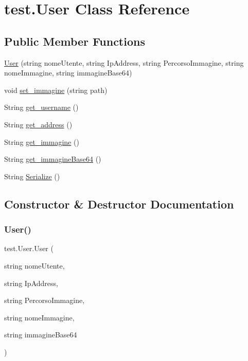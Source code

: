 \hypertarget{classtest_1_1_user}{}\section{test.\+User Class Reference}
\label{classtest_1_1_user}
\subsection*{Public Member Functions}
\begin{DoxyCompactItemize}
\item 
\hyperlink{classtest_1_1_user_aa5b8355fff5692bc8b9b2fcced71d331}{User} (string nome\+Utente, string Ip\+Address, string Percorso\+Immagine, string nome\+Immagine, string immagine\+Base64)
\item 
void \hyperlink{classtest_1_1_user_ac5a4d8f26aae0be17ab0fd22410ecb0a}{set\+\_\+immagine} (string path)
\item 
String \hyperlink{classtest_1_1_user_a1f56726e19de4b123009069dd2f2cba3}{get\+\_\+username} ()
\item 
String \hyperlink{classtest_1_1_user_aaa4b11d84013266789599abf6246e3a6}{get\+\_\+address} ()
\item 
String \hyperlink{classtest_1_1_user_a80ae020596b834407ce9e421595ea291}{get\+\_\+immagine} ()
\item 
String \hyperlink{classtest_1_1_user_a1b26cc2f3735e24053a384c728314926}{get\+\_\+immagine\+Base64} ()
\item 
String \hyperlink{classtest_1_1_user_ae8b9b4349a9658445ed9c1c50022a0b0}{Serialize} ()
\end{DoxyCompactItemize}


\subsection{Constructor \& Destructor Documentation}
\mbox{\label{classtest_1_1_user_aa5b8355fff5692bc8b9b2fcced71d331}} 
\subsubsection{\texorpdfstring{User()}{User()}}
{\footnotesize\ttfamily test.\+User.\+User (\begin{DoxyParamCaption}\item[{string}]{nome\+Utente,  }\item[{string}]{Ip\+Address,  }\item[{string}]{Percorso\+Immagine,  }\item[{string}]{nome\+Immagine,  }\item[{string}]{immagine\+Base64 }\end{DoxyParamCaption})}



